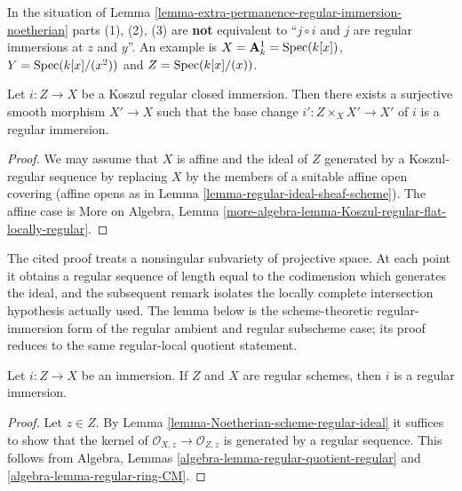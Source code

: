 \begin{remark}
\label{remark-not-always-extra-permanence}
In the situation of
Lemma \ref{lemma-extra-permanence-regular-immersion-noetherian}
parts (1), (2), (3) are {\bf not} equivalent to
``$j \circ i$ and $j$ are regular immersions at $z$ and $y$''.
An example is $X = \mathbf{A}^1_k = \mathop{\mathrm{Spec}}(k[x])$,
$Y = \mathop{\mathrm{Spec}}(k[x]/(x^2))$ and $Z = \mathop{\mathrm{Spec}}(k[x]/(x))$.
\end{remark}

\begin{lemma}
\label{lemma-koszul-regular-smooth-locally-regular}
Let $i : Z \to X$ be a Koszul regular closed immersion.
Then there exists a surjective smooth morphism $X' \to X$ such
that the base change $i' : Z \times_X X' \to X'$ of $i$ is
a regular immersion.
\end{lemma}

\begin{proof}
We may assume that $X$ is affine and the ideal of $Z$ generated by
a Koszul-regular sequence by replacing $X$ by the members of a suitable
affine open covering (affine opens as in
Lemma \ref{lemma-regular-ideal-sheaf-scheme}).
The affine case is
More on Algebra,
Lemma \ref{more-algebra-lemma-Koszul-regular-flat-locally-regular}.
\end{proof}

\begin{lemma}
\label{lemma-immersion-regular-regular-immersion}
\begin{reference}
\cite[Chapter III, \S 5, no. 75, proof of Theorem 3 and Remark,
pp. 269--270]{FAC}
\end{reference}
\begin{history}
The cited proof treats a nonsingular subvariety of projective space. At
each point it obtains a regular sequence of length equal to the codimension
which generates the ideal, and the subsequent remark isolates the locally
complete intersection hypothesis actually used. The lemma below is the
scheme-theoretic regular-immersion form of the regular ambient and regular
subscheme case; its proof reduces to the same regular-local quotient
statement.
\end{history}
Let $i : Z \to X$ be an immersion. If $Z$ and $X$ are
regular schemes, then $i$ is a regular immersion.
\end{lemma}

\begin{proof}
Let $z \in Z$. By Lemma \ref{lemma-Noetherian-scheme-regular-ideal}
it suffices to show that the kernel of
$\mathcal{O}_{X, z} \to \mathcal{O}_{Z, z}$
is generated by a regular sequence. This follows from
Algebra, Lemmas \ref{algebra-lemma-regular-quotient-regular} and
\ref{algebra-lemma-regular-ring-CM}.
\end{proof}





